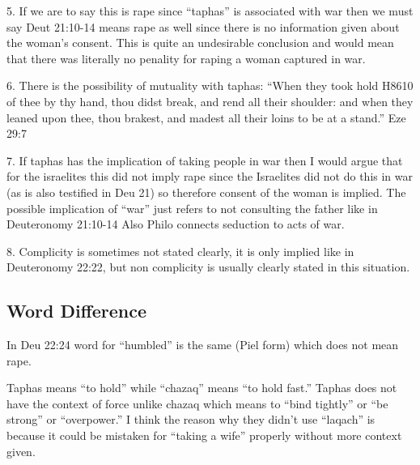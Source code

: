 \documentclass[11pt]{article}
\begin{document}
5. If we are to say this is rape since “taphas” is associated with war then we must say Deut 21:10-14 means rape as well since there is no information given about the woman’s consent. This is quite an undesirable conclusion and would mean that there was literally no penality for raping a woman captured in war. 

6. There is the possibility of mutuality with taphas: “When they took hold H8610 of thee by thy hand, thou didst break, and rend all their shoulder: and when they leaned upon thee, thou brakest, and madest all their loins to be at a stand.” Eze 29:7

7. If taphas has the implication of taking people in war then I would argue that for the israelites this did not imply rape since the Israelites did not do this in war (as is also testified in Deu 21) so therefore consent of the woman is implied. The possible implication of “war” just refers to not consulting the father like in Deuteronomy 21:10-14 Also Philo connects seduction to acts of war.

8. Complicity is sometimes not stated clearly, it is only implied like in Deuteronomy 22:22, but non complicity is usually clearly stated in this situation.

\subsection{Word Difference}

In Deu 22:24 word for “humbled” is the same (Piel form) which does not mean rape.

Taphas means “to hold” while “chazaq” means “to hold fast.” Taphas does not have the context of force unlike chazaq which means to “bind tightly” or “be strong” or “overpower.” I think the reason why they didn’t use “laqach” is because it could be mistaken for “taking a wife” properly without more context given.  
\end{document}
